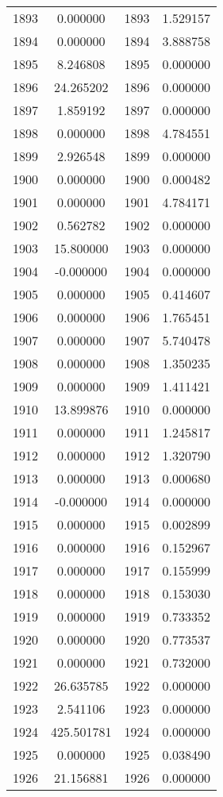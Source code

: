 \documentclass[12pt]{article}
\begin{document}
\begin{longtable}{@{}cccc@{}}
1893 & 0.000000 & 1893 & 1.529157 \\
1894 & 0.000000 & 1894 & 3.888758 \\
1895 & 8.246808 & 1895 & 0.000000 \\
1896 & 24.265202 & 1896 & 0.000000 \\
1897 & 1.859192 & 1897 & 0.000000 \\
1898 & 0.000000 & 1898 & 4.784551 \\
1899 & 2.926548 & 1899 & 0.000000 \\
1900 & 0.000000 & 1900 & 0.000482 \\
1901 & 0.000000 & 1901 & 4.784171 \\
1902 & 0.562782 & 1902 & 0.000000 \\
1903 & 15.800000 & 1903 & 0.000000 \\
1904 & -0.000000 & 1904 & 0.000000 \\
1905 & 0.000000 & 1905 & 0.414607 \\
1906 & 0.000000 & 1906 & 1.765451 \\
1907 & 0.000000 & 1907 & 5.740478 \\
1908 & 0.000000 & 1908 & 1.350235 \\
1909 & 0.000000 & 1909 & 1.411421 \\
1910 & 13.899876 & 1910 & 0.000000 \\
1911 & 0.000000 & 1911 & 1.245817 \\
1912 & 0.000000 & 1912 & 1.320790 \\
1913 & 0.000000 & 1913 & 0.000680 \\
1914 & -0.000000 & 1914 & 0.000000 \\
1915 & 0.000000 & 1915 & 0.002899 \\
1916 & 0.000000 & 1916 & 0.152967 \\
1917 & 0.000000 & 1917 & 0.155999 \\
1918 & 0.000000 & 1918 & 0.153030 \\
1919 & 0.000000 & 1919 & 0.733352 \\
1920 & 0.000000 & 1920 & 0.773537 \\
1921 & 0.000000 & 1921 & 0.732000 \\
1922 & 26.635785 & 1922 & 0.000000 \\
1923 & 2.541106 & 1923 & 0.000000 \\
1924 & 425.501781 & 1924 & 0.000000 \\
1925 & 0.000000 & 1925 & 0.038490 \\
1926 & 21.156881 & 1926 & 0.000000 \\

\end{longtable}
\end{document}

